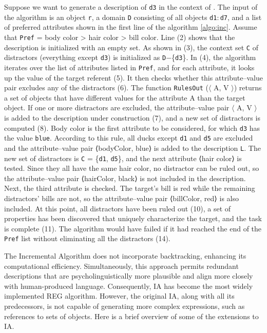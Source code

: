 Suppose we want to generate a description of \texttt{d3} in the context of . The input of the algorithm is an object \texttt{r}, a domain \texttt{D} consisting of all objects \texttt{d1}$:$\texttt{d7}, and a list of preferred attributes shown in the first line of the algorithm \ref{algo:inc}. Assume that \texttt{Pref} = body color > hair color > bill color. Line (2) shows that the description is initialized with an empty set. As shown in (3), the context set \texttt{C} of distractors (everything except \texttt{d3}) is initialized as \texttt{D}$-$\{\texttt{d3}\}. In (4), the algorithm iterates over the list of attributes listed in \texttt{Pref}, and for each attribute, it looks up the value of the target referent (5). It then checks whether this attribute--value pair excludes any of the distractors (6). The function \texttt{RulesOut} ($\langle$ A, V $\rangle$) returns a set of objects that have different values for the attribute A than the target object. If one or more distractors are excluded, the attribute--value pair $\langle$ A, V $\rangle$ is added to the description under construction (7), and a new set of distractors is computed (8). Body color is the first attribute to be considered, for which \texttt{d3} has the value \texttt{blue}. According to this rule, all ducks except \texttt{d1} and \texttt{d5} are excluded and the attribute--value pair ⟨bodyColor, blue⟩ is added to the description \texttt{L}. The new set of distractors is \texttt{C} = \{\texttt{d1}, \texttt{d5}\}, and the next attribute ⟨hair color⟩ is tested. Since they all have the same hair color, no distractor can be ruled out, so the attribute--value pair ⟨hairColor, black⟩ is not included in the description. Next, the third attribute is checked. The target's bill is red while the remaining distractors' bills are not, so the attribute--value pair ⟨billColor, red⟩ is also included. At this point, all distractors have been ruled out (10), a set of properties has been discovered that uniquely characterize the target, and the task is complete (11). The algorithm would have failed if it had reached the end of the \texttt{Pref} list without eliminating all the distractors (14).

The Incremental Algorithm does not incorporate backtracking, enhancing its computational efficiency. Simultaneously, this approach permits redundant descriptions that are psycholinguistically more plausible and align more closely with human-produced language. Consequently, IA has become the most widely implemented REG algorithm. However, the original IA, along with all its predecessors, is not capable of generating more complex expressions, such as references to sets of objects. Here is a brief overview of some of the extensions to IA.
 
